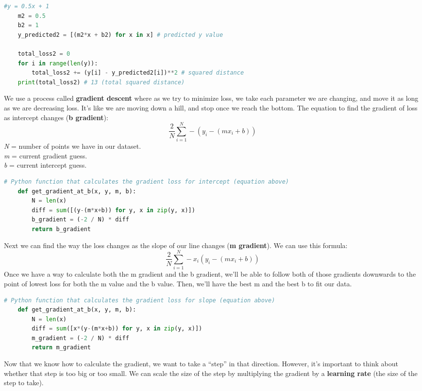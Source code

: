\documentclass[11pt, a4paper]{article}
\begin{document}
\begin{spacing}{1.1}
\begin{lstlisting}[language=Python]
	#y = 0.5x + 1
	m2 = 0.5
	b2 = 1
	y_predicted2 = [(m2*x + b2) for x in x] # predicted y value
	
	total_loss2 = 0
	for i in range(len(y)):
		total_loss2 += (y[i] - y_predicted2[i])**2 # squared distance
	print(total_loss2) # 13 (total squared distance) \end{lstlisting}\vspace*{1mm}
	We use a process called \textbf{gradient descent} where as we try to minimize loss, we take each parameter we are changing, and move it as long as we are decreasing loss. It’s like we are moving down a hill, and stop once we reach the bottom. The equation to find the gradient of loss as intercept changes (\textbf{b gradient}): $$ \frac{2}{N} \sum_{i=1}^{N} -(y_i - (mx_i + b)) $$ \textit{N} = number of points we have in our dataset. \\ \textit{m} = current gradient guess. \\ \textit{b} = current intercept guess. \newpage
	\begin{lstlisting}[language=Python]
	# Python function that calculates the gradient loss for intercept (equation above)
	def get_gradient_at_b(x, y, m, b):
		N = len(x) 
		diff = sum([(y-(m*x+b)) for y, x in zip(y, x)])
		b_gradient = (-2 / N) * diff
		return b_gradient \end{lstlisting}\vspace*{1mm}
	Next we can find the way the loss changes as the slope of our line changes (\textbf{m gradient}). We can use this formula: $$ \frac{2}{N} \sum_{i=1}^{N} -x_i(y_i - (mx_i + b)) $$ Once we have a way to calculate both the m gradient and the b gradient, we’ll be able to follow both of those gradients downwards to the point of lowest loss for both the m value and the b value. Then, we’ll have the best m and the best b to fit our data.
	\begin{lstlisting}[language=Python]
	# Python function that calculates the gradient loss for slope (equation above)
	def get_gradient_at_b(x, y, m, b):
		N = len(x) 
		diff = sum([x*(y-(m*x+b)) for y, x in zip(y, x)])
		m_gradient = (-2 / N) * diff
		return m_gradient \end{lstlisting}\vspace*{1mm}
	Now that we know how to calculate the gradient, we want to take a “step” in that direction. However, it’s important to think about whether that step is too big or too small. We can scale the size of the step by multiplying the gradient by a \textbf{learning rate} (the size of the step to take).  

\end{spacing}
\end{document}
